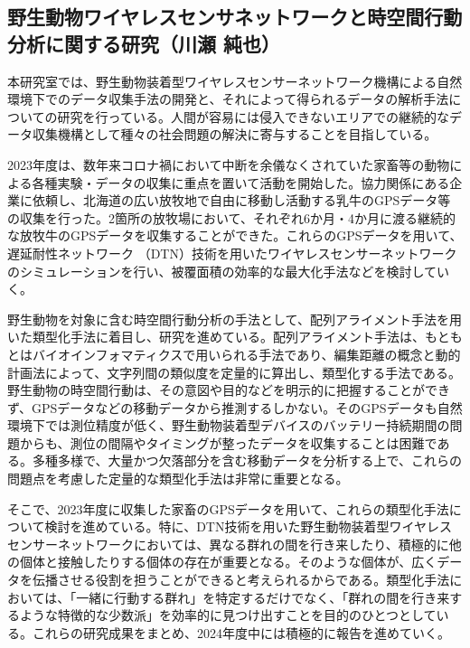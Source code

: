 \subsection{野生動物ワイヤレスセンサネットワークと時空間行動分析に関する研究（川瀬 純也）}
本研究室では、野生動物装着型ワイヤレスセンサーネットワーク機構による自然環境下でのデータ収集手法の開発と、それによって得られるデータの解析手法についての研究を行っている。人間が容易には侵入できないエリアでの継続的なデータ収集機構として種々の社会問題の解決に寄与することを目指している。

2023年度は、数年来コロナ禍において中断を余儀なくされていた家畜等の動物による各種実験・データの収集に重点を置いて活動を開始した。協力関係にある企業に依頼し、北海道の広い放牧地で自由に移動し活動する乳牛のGPSデータ等の収集を行った。2箇所の放牧場において、それぞれ6か月・4か月に渡る継続的な放牧牛のGPSデータを収集することができた。これらのGPSデータを用いて、遅延耐性ネットワーク （DTN）技術を用いたワイヤレスセンサーネットワークのシミュレーションを行い、被覆面積の効率的な最大化手法などを検討していく。
 
野生動物を対象に含む時空間行動分析の手法として、配列アライメント手法を用いた類型化手法に着目し、研究を進めている。配列アライメント手法は、もともとはバイオインフォマティクスで用いられる手法であり、編集距離の概念と動的計画法によって、文字列間の類似度を定量的に算出し、類型化する手法である。野生動物の時空間行動は、その意図や目的などを明示的に把握することができず、GPSデータなどの移動データから推測するしかない。そのGPSデータも自然環境下では測位精度が低く、野生動物装着型デバイスのバッテリー持続期間の問題からも、測位の間隔やタイミングが整ったデータを収集することは困難である。多種多様で、大量かつ欠落部分を含む移動データを分析する上で、これらの問題点を考慮した定量的な類型化手法は非常に重要となる。
 
そこで、2023年度に収集した家畜のGPSデータを用いて、これらの類型化手法について検討を進めている。特に、DTN技術を用いた野生動物装着型ワイヤレスセンサーネットワークにおいては、異なる群れの間を行き来したり、積極的に他の個体と接触したりする個体の存在が重要となる。そのような個体が、広くデータを伝播させる役割を担うことができると考えられるからである。類型化手法においては、「一緒に行動する群れ」を特定するだけでなく、「群れの間を行き来するような特徴的な少数派」を効率的に見つけ出すことを目的のひとつとしている。これらの研究成果をまとめ、2024年度中には積極的に報告を進めていく。
